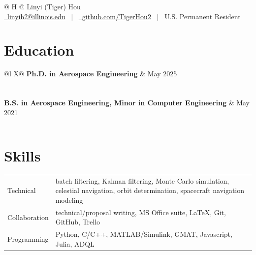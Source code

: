 \documentclass[letterpaper,12pt]{article}
\begin{document}
	
	\thispagestyle{firstpage}
	\vspace*{-53pt}


	\begin{tabularx}{\linewidth}{@{} H @{}}
		\Huge{Linyi (Tiger) Hou} \\[7.5pt]
		\href{mailto:linyih2@illinois.edu}{\raisebox{-0.05\height}\faEnvelope \ linyih2@illinois.edu}
		\ $|$ \ \href{https://github.com/TigerHou2}{\raisebox{-0.05\height}\faGithub \ github.com/TigerHou2}
		\ $|$ \ U.S. Permanent Resident \\
	\end{tabularx}



	\section{Education}
	\begin{tabularx}{\linewidth}{@{}l X@{}}
		\textbf{Ph.D. in Aerospace Engineering} & \hfill May 2025 \\
		 \\
		 \\[3.75pt]
		\textbf{B.S. in Aerospace Engineering, Minor in Computer Engineering} & \hfill May 2021 \\
		 \\
	\end{tabularx}
	
	

	\section{Skills}
	\begin{tabularx}{\linewidth}{@{}l X@{}}
		Technical  &  batch filtering, Kalman filtering, Monte Carlo simulation, celestial navigation, orbit determination, spacecraft navigation modeling \\[3.75pt]
		Collaboration  &  technical/proposal writing, MS Office suite, \LaTeX, Git, GitHub, Trello \\[3.75pt]
		Programming  &  Python, C/C++, MATLAB/Simulink, GMAT, Javascript, Julia, ADQL \\[3.75pt]
	\end{tabularx}
\end{document}
